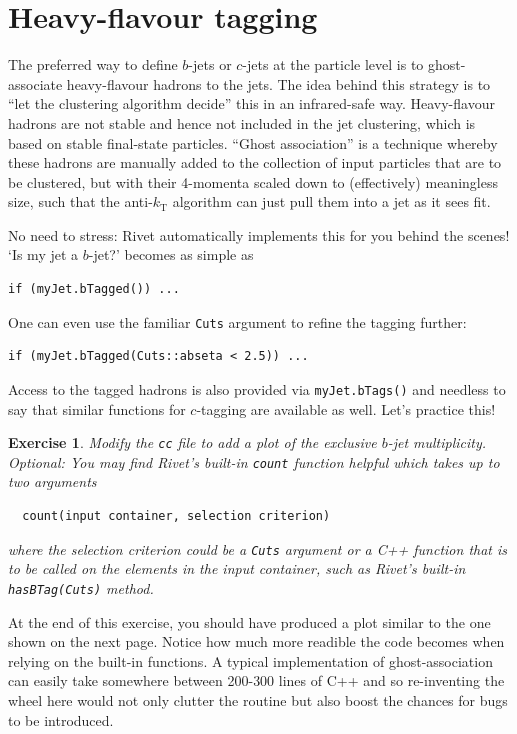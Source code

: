 \documentclass[10pt,fleqn]{scrartcl}
\theoremstyle{exstyle}
\newtheorem{exercise}{Exercise}
\begin{document}
\section{Heavy-flavour tagging}

The preferred way to define $b$-jets or $c$-jets at the particle level 
is to ghost-associate heavy-flavour hadrons to the jets.
The idea behind this strategy is to ``let the clustering algorithm decide''
this in an infrared-safe way.
Heavy-flavour hadrons are not stable and hence not included in the jet clustering,
which is based on stable final-state particles.
``Ghost association'' is a technique whereby these hadrons are manually added to the collection of
input particles that are to be clustered, but with their 4-momenta scaled down to (effectively) meaningless size,
such that the anti-$k_\text{T}$ algorithm can just pull them into a jet as it sees fit.

No need to stress: Rivet automatically implements this for you behind the scenes!
`Is my jet a $b$-jet?' becomes as simple as
\begin{verbatim}
if (myJet.bTagged()) ...
\end{verbatim}
One can even use the familiar \verb|Cuts| argument to refine the tagging further:
\begin{verbatim}
if (myJet.bTagged(Cuts::abseta < 2.5)) ...
\end{verbatim}
Access to the tagged hadrons is also provided via \verb|myJet.bTags()| and
needless to say that similar functions for $c$-tagging are available as well.
Let's practice this!

\begin{exercise}
Modify the \verb|cc| file to add a plot of the exclusive $b$-jet multiplicity.
\emph{Optional:} You may find Rivet's built-in \verb|count| function
helpful which takes up to two arguments
\begin{verbatim}
  count(input container, selection criterion)
\end{verbatim}
where the selection criterion could be a \verb|Cuts| argument or a C++ function
that is to be called on the elements in the input container, such as
Rivet's built-in \verb|hasBTag(Cuts)| method.
\end{exercise}

At the end of this exercise, you should have produced a plot similar to
the one shown on the next page. Notice how much more readible the code
becomes when relying on the built-in functions. A typical implementation
of ghost-association can easily take somewhere between 200-300 lines of C++
and so re-inventing the wheel here would not only clutter the routine 
but also boost the chances for bugs to be introduced.
\end{document}
